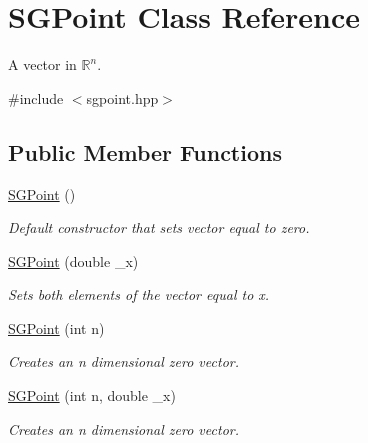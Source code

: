 \hypertarget{classSGPoint}{}\section{S\+G\+Point Class Reference}
\label{classSGPoint}


A vector in $\mathbb{R}^n$.  




{\ttfamily \#include $<$sgpoint.\+hpp$>$}

\subsection*{Public Member Functions}
\begin{DoxyCompactItemize}
\item 
\mbox{\label{classSGPoint_aa8127de54b9fae207ca43a60414a3dd8}} 
\hyperlink{classSGPoint_aa8127de54b9fae207ca43a60414a3dd8}{S\+G\+Point} ()
\begin{DoxyCompactList}\small\item\em Default constructor that sets vector equal to zero. \end{DoxyCompactList}\item 
\mbox{\label{classSGPoint_ab8c81373ad29ed71f85cee6b9a8a0b1f}} 
\hyperlink{classSGPoint_ab8c81373ad29ed71f85cee6b9a8a0b1f}{S\+G\+Point} (double \+\_\+x)
\begin{DoxyCompactList}\small\item\em Sets both elements of the vector equal to x. \end{DoxyCompactList}\item 
\mbox{\label{classSGPoint_a4814e2ff4c9e36fb827fb30c44f052c0}} 
\hyperlink{classSGPoint_a4814e2ff4c9e36fb827fb30c44f052c0}{S\+G\+Point} (int n)
\begin{DoxyCompactList}\small\item\em Creates an n dimensional zero vector. \end{DoxyCompactList}\item 
\mbox{\label{classSGPoint_aa43a077b3b809f4cdaefab71ef6a8e92}} 
\hyperlink{classSGPoint_aa43a077b3b809f4cdaefab71ef6a8e92}{S\+G\+Point} (int n, double \+\_\+x)
\begin{DoxyCompactList}\small\item\em Creates an n dimensional zero vector. \end{DoxyCompactList}\item 

\end{DoxyCompactItemize}
